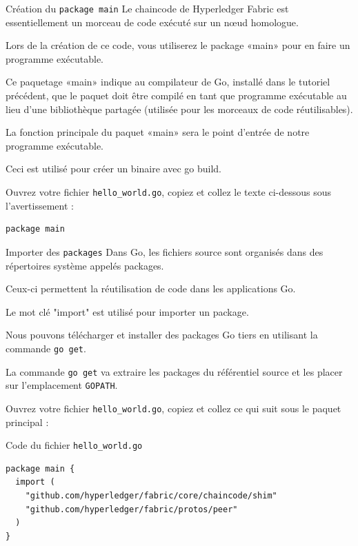 \documentclass[presentation]{beamer}
\begin{document}
\begin{frame}[fragile,label={sec:org3c91350}]{Création du \texttt{package main}}
 Le chaincode de Hyperledger Fabric est essentiellement un morceau de code exécuté sur un nœud homologue. 

Lors de la création de ce code, vous utiliserez le package «main» pour en faire un programme exécutable. 

Ce paquetage «main» indique au compilateur de Go, installé dans le tutoriel précédent, que le paquet doit 
être compilé en tant que programme exécutable au lieu d’une bibliothèque partagée (utilisée pour les 
morceaux de code réutilisables).

La fonction principale du paquet «main» sera le point d’entrée de notre programme exécutable. 

Ceci est utilisé pour créer un binaire avec go build.

Ouvrez votre fichier \texttt{hello\_world.go}, copiez et collez le texte ci-dessous sous l'avertissement :

\begin{verbatim}
package main
\end{verbatim}
\end{frame}
\begin{frame}[fragile,label={sec:org829c0a2}]{Importer des \texttt{packages}}
 Dans Go, les fichiers source sont organisés dans des répertoires système appelés packages. 

Ceux-ci permettent la réutilisation de code dans les applications Go. 

Le mot clé "import" est utilisé pour importer un package. 

Nous pouvons télécharger et installer des packages Go tiers en utilisant la commande \texttt{go get}. 

La commande \texttt{go get} va extraire les packages du référentiel source et les placer sur l'emplacement \texttt{GOPATH}.

Ouvrez votre fichier \texttt{hello\_world.go}, copiez et collez ce qui suit sous le paquet principal :
\end{frame}
\begin{frame}[fragile,label={sec:orgf985e17}]{Code du fichier \texttt{hello\_world.go}}
 \begin{verbatim}
package main {
  import (
	"github.com/hyperledger/fabric/core/chaincode/shim"
	"github.com/hyperledger/fabric/protos/peer"
  )
}
\end{verbatim}
\end{frame}
\end{document}
